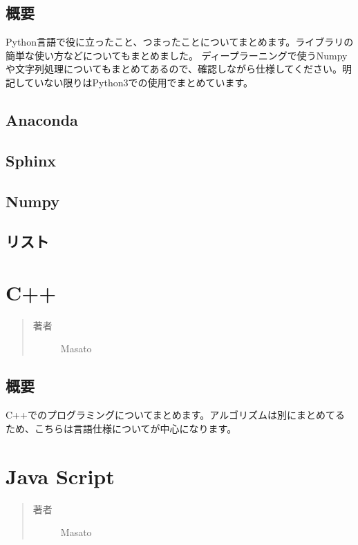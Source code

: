 \documentclass[letterpaper,10pt,dvipdfmx]{sphinxmanual}
\begin{document}
\section{概要}
\label{learned_programing_python:id1}
Python言語で役に立ったこと、つまったことについてまとめます。ライブラリの簡単な使い方などについてもまとめました。
ディープラーニングで使うNumpyや文字列処理についてもまとめてあるので、確認しながら仕様してください。明記していない限りはPython3での使用でまとめています。


\section{Anaconda}
\label{learned_programing_python:anaconda}

\section{Sphinx}
\label{learned_programing_python:sphinx}

\section{Numpy}
\label{learned_programing_python:numpy}

\section{リスト}
\label{learned_programing_python:id2}

\chapter{C++}
\label{learned_programing_cpp::doc}\label{learned_programing_cpp:c}\begin{quote}\begin{description}
\item[{著者}] \leavevmode
Masato

\end{description}\end{quote}


\section{概要}
\label{learned_programing_cpp:id1}
C++でのプログラミングについてまとめます。アルゴリズムは別にまとめてるため、こちらは言語仕様についてが中心になります。


\chapter{Java Script}
\label{learned_programing_js:java-script}\label{learned_programing_js::doc}\begin{quote}\begin{description}
\item[{著者}] \leavevmode
Masato

\end{description}\end{quote}
\end{document}
